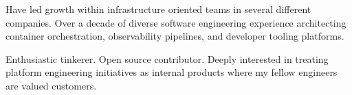

\begin{cvparagraph}

Have led growth within infrastructure oriented teams in several different companies. Over a decade of diverse software engineering experience architecting container orchestration, observability pipelines, and developer tooling platforms.

Enthusiastic tinkerer. Open source contributor. Deeply interested in treating platform engineering initiatives as internal products where my fellow engineers are valued customers.
\end{cvparagraph}
